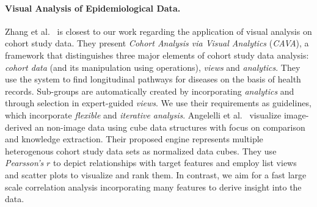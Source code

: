 \documentclass[journal]{style/vgtc} 			          %
\begin{document}
\paragraph{Visual Analysis of Epidemiological Data.}
Zhang et al.~\cite{Zhang2014, Gotz2014} is closest to our work regarding the application of visual analysis on cohort study data.
They present \emph{Cohort Analysis via Visual Analytics} (\emph{CAVA}), a framework that distinguishes three major elements of cohort study data analysis: \emph{cohort data} (and its manipulation using operations), \emph{views} and \emph{analytics}.
They use the system to find longitudinal pathways for diseases on the basis of health records.
Sub-groups are automatically created by incorporating \emph{analytics} and through selection in expert-guided \emph{views}.
We use their requirements as guidelines, which incorporate \emph{flexible} and \emph{iterative analysis}. %
Angelelli et al.~\cite{Angelelli} visualize image-derived an non-image data using cube data structures with focus on comparison and knowledge extraction.
Their proposed engine represents multiple heterogenous cohort study data sets as normalized data cubes.
They use \emph{Pearsson's} $r$ to depict relationships with target features and employ list views and scatter plots to visualize and rank them.
In contrast, we aim for a fast large scale correlation analysis incorporating many features to derive insight into the data.
\end{document}
